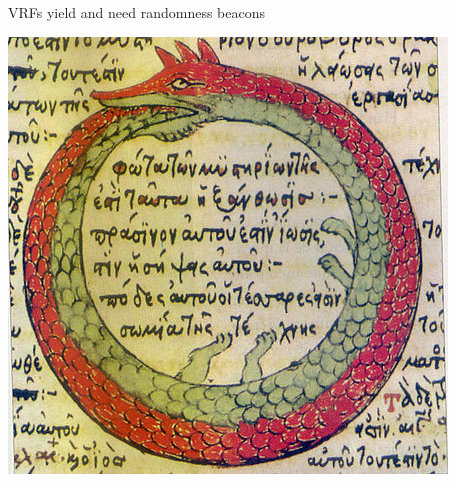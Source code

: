 \documentclass[fleqn,xcolor={usenames,dvipsnames},notes,aspectratio=169]{beamer} %
\begin{document}
\begin{frame}{VRFs yield and need randomness beacons}
\begin{center} \includegraphics{../pics/ouroborous/440px-Serpiente_alquimica.jpg} \end{center}
\end{frame}
\end{document}
